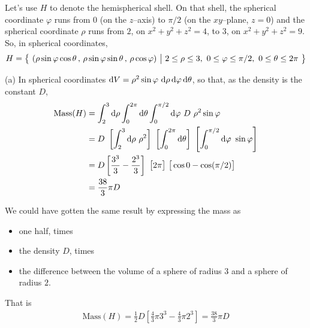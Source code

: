 \begin{solution}
Let's use $H$ to denote the hemispherical shell.
On that shell, the spherical coordinate $\varphi$ runs from $0$
(on the $z$--axis) to $\pi/2$ (on the $xy$--plane, $z=0$)
and the spherical coordinate $\rho$ runs from $2$, on $x^2+y^2+z^2=4$,
to $3$, on $x^2+y^2+z^2=9$. So, in spherical coordinates,
\begin{align*}
H=\big\{ \ 
(\rho\sin\varphi\cos\theta\,,\,\rho\sin\varphi\sin\theta\,,\,\rho\cos\varphi)\ \big|\ 2\le \rho\le 3,\ 0\le\varphi\le\pi/2,\ 0\le\theta\le 2\pi\ \big\}
\end{align*}

(a) In spherical coordinates 
$\dee{V}=\rho^2\sin\varphi\ \dee{\rho}\,\dee{\varphi}\,\dee{\theta}$,
so that, as the density is the constant $D$,
\begin{align*}
\text{Mass}(H)
&=\int_2^3\dee{\rho} \int_0^{2\pi}\dee{\theta}\int_0^{\pi/2}\dee{\varphi}\ 
           D\ \rho^2\sin\varphi \\
&=D\ \left[\int_2^3\dee{\rho}\ \rho^2\right]\ 
     \left[\int_0^{2\pi}\dee{\theta}\right]\ 
     \left[\int_0^{\pi/2}\dee{\varphi}\ \sin\varphi\right] \\
&= D\left[\frac{3^3}{3}-\frac{2^3}{3}\right]\ 
     \big[2\pi\big]\ \big[\cos 0 -\cos(\pi/2)\big] \\
&=\frac{38}{3}\pi D
\end{align*}

\goodbreak
We could have gotten the same result by expressing the mass as
\begin{itemize}
\item
one half, times
\item
the density $D$, times
\item
the difference between 
the volume of a sphere of radius $3$ and a sphere of radius $2$.
\end{itemize}
That is
\begin{align*}
\text{Mass}(H) =\frac{1}{2}D\left[\frac{4}{3}\pi 3^3-\frac{4}{3}\pi 2^3\right]
               =\frac{38}{3}\pi D
\end{align*}


\end{solution}
